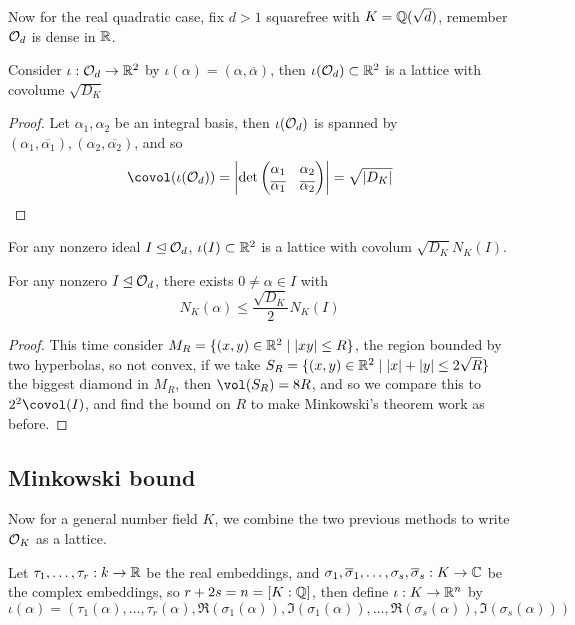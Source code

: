 \documentclass{article}
\begin{document}
Now for the real quadratic case, fix $d > 1$ squarefree with $K= \mathbb{Q}(\sqrt{d})$, remember $\mathcal{O}_d$ is dense in $\mathbb{R}$.

\begin{lemma}
    Consider $\iota:\mathcal{O}_d\rightarrow \mathbb{R}^2$ by $\iota(\alpha) = (\alpha,\overline{\alpha})$, then $\iota(\mathcal{O}_d)\subset \mathbb{R}^2$ is a lattice with covolume $\sqrt{D_K}$\begin{proof}
        Let $\alpha_1,\alpha_2$ be an integral basis, then $\iota(\mathcal{O}_d)$ is spanned by $(\alpha_1,\overline{\alpha_1}),(\alpha_2,\overline{\alpha_2})$, and so \[
        \covol(\iota(\cO_d)) = \abs{\det\begin{pmatrix}
            \alpha_1 & \alpha_2 \\ \overline{\alpha_1} & \overline{\alpha_2}
        \end{pmatrix}} = \sqrt{\abs{D_K}}\qedhere
        \]
    \end{proof}
\end{lemma}

\begin{corollary}
    For any nonzero ideal $I\unlhd \mathcal{O}_d$, $\iota(I)\subset \mathbb{R}^2$ is a lattice with covolum $\sqrt{D_K}N_K(I)$.
\end{corollary}

\begin{theorem}
    For any nonzero $I\unlhd \mathcal{O}_d$, there exists $0\neq \alpha \in I$ with \[
    N_K(\alpha)\leq \frac{\sqrt{D_K}}{2}N_K(I)
    \]\begin{proof}
        This time consider $M_R = \{(x,y) \in \mathbb{R}^2 \mid \left| xy \right|\leq R\}$, the region bounded by two hyperbolas, so not convex, if we take $S_R = \{(x,y)\in \mathbb{R}^2 \mid \left| x \right|+\left| y \right|\leq 2\sqrt{R}\}$ the biggest diamond in $M_R$, then $\vol(S_R) = 8R$, and so we compare this to $2^2\covol(I)$, and find the bound on $R$ to make Minkowski's theorem work as before.
    \end{proof}
\end{theorem}

\subsection{Minkowski bound}

Now for a general number field $K$, we combine the two previous methods to write $\mathcal{O}_K$ as a lattice.

Let $\tau_1,\ldots,\tau_r:k\rightarrow \mathbb{R}$ be the real embeddings, and $\sigma_1, \overline{\sigma}_1,\ldots,\sigma_s,\overline{\sigma}_s:K\rightarrow \mathbb{C}$ be the complex embeddings, so $r+2s=n = [K:\mathbb{Q}]$, then define $\iota:K\rightarrow \mathbb{R}^n$ by \[
\iota(\alpha) = (\tau_1(\alpha),\ldots,\tau_r(\alpha),\Re(\sigma_1(\alpha)),\Im(\sigma_1(\alpha)),\ldots,\Re(\sigma_s(\alpha)),\Im(\sigma_s(\alpha)))
\]
\end{document}
